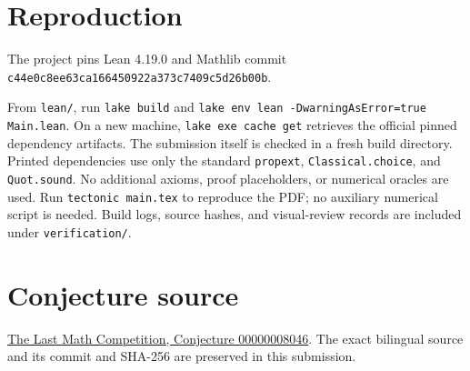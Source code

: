 \documentclass[11pt]{article}
\begin{document}
\section*{Reproduction}
The project pins Lean 4.19.0 and Mathlib commit
\\\texttt{c44e0c8ee63ca166450922a373c7409c5d26b00b}.\par
From \texttt{lean/}, run \texttt{lake build} and
\texttt{lake env lean -DwarningAsError=true Main.lean}.
On a new machine, \texttt{lake exe cache get} retrieves the official
pinned dependency artifacts. The submission itself is checked in a fresh
build directory. Printed dependencies use only the standard
\texttt{propext}, \texttt{Classical.choice}, and \texttt{Quot.sound}.
No additional axioms, proof placeholders, or numerical oracles are used.
Run \texttt{tectonic main.tex} to reproduce the PDF; no auxiliary numerical
script is needed. Build logs, source hashes, and visual-review records
are included under \texttt{verification/}.
\section*{Conjecture source}
\href{https://github.com/The-Last-Math-Competition/The-Last-Math-Competition/blob/main/conjectures/00000008046.md}{The Last Math Competition, Conjecture 00000008046}. The exact bilingual source and its commit and SHA-256 are preserved in this submission.
\end{document}
